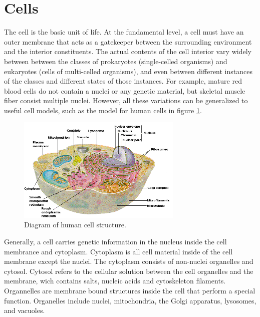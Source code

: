 

\section{Cells}
\par The cell is the basic unit of life. At the fundamental level, a cell must have an outer membrane that acts as a gatekeeper between the surrounding environment and the interior constituents. The actual contents of the cell interior vary widely between between the classes of prokaryotes (single-celled organisms) and eukaryotes (cells of multi-celled organisms), and even between different instances of the classes and different states of those instances. For example, mature red blood cells do not contain a nuclei or any genetic material, but skeletal muscle fiber consist multiple nuclei. However, all these variations can be generalized to useful cell models, such as the model for human cells in figure \ref{fig:human_cell_model}.   
\begin{figure}[ht]
 \centering
 \includegraphics[width=0.7\textwidth]{images/humanCellOverview.png}
 \caption[Diagram of human cell structure.]{Diagram of human cell structure. \cite{daniel_d_chiras_human_2005} }
 \label{fig:human_cell_model}
 \end{figure}
 
 
 \par Generally, a cell carries genetic information in the nucleus inside the cell membrance and cytoplasm. Cytoplasm is all cell material inside of the cell membrane except the nuclei. The cytoplasm consists of non-nuclei organelles and cytosol.  Cytosol refers to the cellular solution between the cell organelles and the membrane, wich contains salts, nucleic acids and cytoskeleton filaments. Organnelles are membrane bound structures inside the cell that perform a special function. Organelles include nuclei, mitochondria, the Golgi apparatus, lysosomes, and vacuoles.  
 
